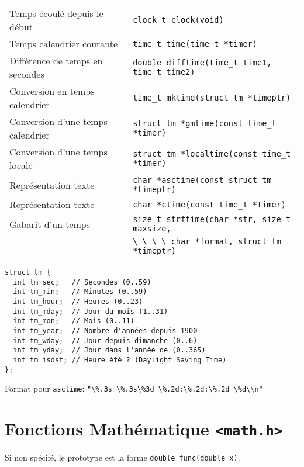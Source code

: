 \documentclass{article}
\newcommand{\cd}{\lstinline}
\begin{document}
\begin{multicols*}{3}
\begin{tabularx}{\linewidth}{Xl}
  Temps écoulé depuis le début & \cd{clock_t clock(void)} \\
  Temps calendrier courante & \cd{time_t time(time_t *timer)} \\
  Différence de temps en secondes & \cd{double difftime(time_t time1, time_t time2)} \\
  Conversion en temps calendrier & \cd{time_t mktime(struct tm *timeptr)} \\
  Conversion d'une temps calendrier & \cd{struct tm *gmtime(const time_t *timer)} \\
  Conversion d'une temps locale & \cd{struct tm *localtime(const time_t *timer)} \\
  Représentation texte & \cd{char *asctime(const struct tm *timeptr)} \\
  Représentation texte & \cd{char *ctime(const time_t *timer)} \\
  Gabarit d'un temps & \cd{size_t strftime(char *str, size_t maxsize,} \\
                     & \cd{\ \ \ \ char *format, struct tm *timeptr)} \\
\end{tabularx}

{
\small
\begin{lstlisting}
struct tm {
  int tm_sec;   // Secondes (0..59)
  int tm_min;   // Minutes (0..59)
  int tm_hour;  // Heures (0..23)
  int tm_mday;  // Jour du mois (1..31)
  int tm_mon;   // Mois (0..11)
  int tm_year;  // Nombre d'années depuis 1900
  int tm_wday;  // Jour depuis dimanche (0..6)
  int tm_yday;  // Jour dans l'année de (0..365)
  int tm_isdst; // Heure été ? (Daylight Saving Time)
};
\end{lstlisting}
}

Format pour \texttt{asctime}: \cd{"\%.3s \%.3s\%3d \%.2d:\%.2d:\%.2d \%d\\n"}

\section*{Fonctions Mathématique \texttt{<math.h>}}

Si non spécifé, le prototype est la forme \cd{double func(double x)}.


\end{multicols*}
\end{document}
